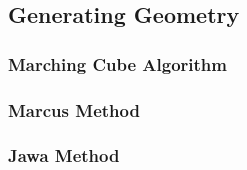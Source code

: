 \subsection{Generating Geometry}

\subsubsection{Marching Cube Algorithm}

\subsubsection{Marcus Method}

\subsubsection{Jawa Method}
